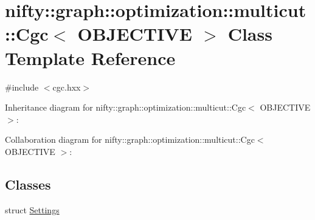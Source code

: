 \hypertarget{classnifty_1_1graph_1_1optimization_1_1multicut_1_1Cgc}{}\section{nifty\+:\+:graph\+:\+:optimization\+:\+:multicut\+:\+:Cgc$<$ O\+B\+J\+E\+C\+T\+I\+V\+E $>$ Class Template Reference}
\label{classnifty_1_1graph_1_1optimization_1_1multicut_1_1Cgc}


{\ttfamily \#include $<$cgc.\+hxx$>$}



Inheritance diagram for nifty\+:\+:graph\+:\+:optimization\+:\+:multicut\+:\+:Cgc$<$ O\+B\+J\+E\+C\+T\+I\+V\+E $>$\+:


Collaboration diagram for nifty\+:\+:graph\+:\+:optimization\+:\+:multicut\+:\+:Cgc$<$ O\+B\+J\+E\+C\+T\+I\+V\+E $>$\+:
\subsection*{Classes}
\begin{DoxyCompactItemize}
\item 
struct \hyperlink{structnifty_1_1graph_1_1optimization_1_1multicut_1_1Cgc_1_1Settings}{Settings}
\end{DoxyCompactItemize}

